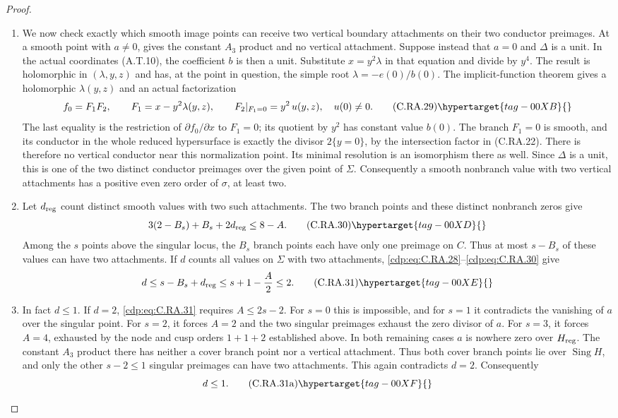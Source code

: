 \begin{proof}
\begin{enumerate}[label={$\langle1\rangle$\arabic*.},leftmargin=*]
\item We now check exactly which smooth image points can
receive two vertical boundary attachments on their two
conductor preimages. At a smooth point with $a\ne0$,
 gives the constant $A_3$ product and no vertical
attachment. Suppose instead that $a=0$ and $\Delta$
is a unit. In the actual coordinates (A.T.10), the
coefficient $b$ is then a unit. Substitute $x=y^2\lambda$
in that equation and divide by $y^4$. The result is
holomorphic in $(\lambda,y,z)$ and has, at the point
in question, the simple root
$\lambda=-e(0)/b(0)$. The implicit-function theorem
gives a holomorphic $\lambda(y,z)$ and an actual
factorization
\[
 f_0=F_1F_2,\qquad
 F_1=x-y^2\lambda(y,z),\qquad
 F_2|_{F_1=0}=y^2\,u(y,z),\quad u(0)\ne0.
\tag{C.RA.29}\hypertarget{tag-00XB}{}\label{cdp:eq:C.RA.29}
\]
The last equality is the restriction of
$\partial f_0/\partial x$ to $F_1=0$; its quotient
by $y^2$ has constant value $b(0)$.
The branch $F_1=0$ is smooth, and its conductor in the
whole reduced hypersurface is exactly the divisor
$2\{y=0\}$, by the intersection factor in
(C.RA.22). There is therefore no vertical conductor
near this normalization point. Its minimal resolution
is an isomorphism there as well. Since $\Delta$ is a
unit, this is one of the two distinct conductor
preimages over the given point of $\Sigma$.
Consequently a smooth nonbranch value with two vertical
attachments has a positive even zero order of $\sigma$,
at least two.

\item Let $d_{\rm reg}$ count distinct smooth values with
two such attachments. The two branch points and these
distinct nonbranch zeros give
\[
             3(2-B_s)+B_s+2d_{\rm reg}\le8-A.
\tag{C.RA.30}\hypertarget{tag-00XD}{}\label{cdp:eq:C.RA.30}
\]
Among the $s$ points above the singular locus, the
$B_s$ branch points each have only one preimage on
$C$. Thus at most $s-B_s$ of these values can have
two attachments. If $d$ counts all values on
$\Sigma$ with two attachments, \eqref{cdp:eq:C.RA.28}--\eqref{cdp:eq:C.RA.30}
give
\[
 d\le s-B_s+d_{\rm reg}
       \le s+1-\frac A2\le2.
\tag{C.RA.31}\hypertarget{tag-00XE}{}\label{cdp:eq:C.RA.31}
\]

\item In fact $d\le1$. If $d=2$, \eqref{cdp:eq:C.RA.31} requires
$A\le2s-2$. For $s=0$ this is impossible, and for
$s=1$ it contradicts the vanishing of $a$ over the
singular point. For $s=2$, it forces $A=2$ and
the two singular preimages exhaust the zero divisor
of $a$. For $s=3$, it forces $A=4$, exhausted by
the node and cusp orders $1+1+2$ established above.
In both remaining cases $a$ is nowhere zero over
$H_{\rm reg}$. The constant $A_3$ product there
has neither a cover branch point nor a vertical
attachment. Thus both cover branch points lie
over $\operatorname{Sing}H$, and only the other
$s-2\le1$ singular preimages can have two
attachments. This again contradicts $d=2$.
Consequently
\[
                            d\le1.
\tag{C.RA.31a}\hypertarget{tag-00XF}{}\label{cdp:eq:C.RA.31a}
\]


\end{enumerate}
\end{proof}
